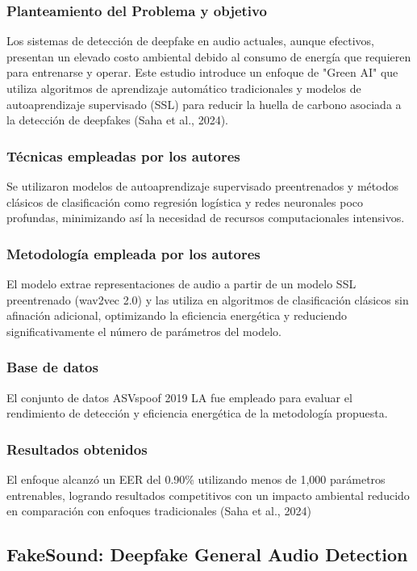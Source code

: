 \subsubsection{Planteamiento del Problema y objetivo }
Los sistemas de detección de deepfake en audio actuales, aunque efectivos, presentan un elevado costo ambiental debido al consumo de energía que requieren para entrenarse y operar. Este estudio introduce un enfoque de "Green AI" que utiliza algoritmos de aprendizaje automático tradicionales y modelos de autoaprendizaje supervisado (SSL) para reducir la huella de carbono asociada a la detección de deepfakes (Saha et al., 2024).

\subsubsection{Técnicas empleadas por los autores}
Se utilizaron modelos de autoaprendizaje supervisado preentrenados y métodos clásicos de clasificación como regresión logística y redes neuronales poco profundas, minimizando así la necesidad de recursos computacionales intensivos.

\subsubsection{Metodología empleada por los autores}
El modelo extrae representaciones de audio a partir de un modelo SSL preentrenado (wav2vec 2.0) y las utiliza en algoritmos de clasificación clásicos sin afinación adicional, optimizando la eficiencia energética y reduciendo significativamente el número de parámetros del modelo.

\subsubsection{Base de datos}
El conjunto de datos ASVspoof 2019 LA fue empleado para evaluar el rendimiento de detección y eficiencia energética de la metodología propuesta.

\subsubsection{Resultados obtenidos}
El enfoque alcanzó un EER del 0.90\% utilizando menos de 1,000 parámetros entrenables, logrando resultados competitivos con un impacto ambiental reducido en comparación con enfoques tradicionales (Saha et al., 2024)

\subsection{FakeSound: Deepfake General Audio Detection \citep*{pr_dehghani2018copper}}

